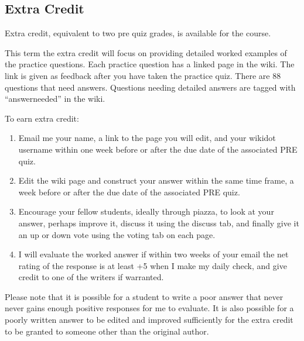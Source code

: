 \documentclass[letterpaper,10pt]{article}
\newif\ifonline
\begin{document}
\fi

\ifonline

\else
\subsection{Extra Credit}\label{sec:ExtraCredit}
Extra credit, equivalent to two pre quiz grades, is available for the
course.  

This term the extra credit will focus on providing detailed worked examples of the practice questions.  Each practice question has a linked page in the wiki.  The link is given as feedback after you have taken the practice quiz.  There are 88 questions that need answers.  Questions needing detailed answers are tagged with ``answerneeded'' in the wiki.

To earn extra credit:
\begin{enumerate}
    
    \item Email me your name, a link to the page you will edit, and your wikidot username within one week before or after the due date of the associated PRE quiz. 
    
    \item Edit the wiki page and construct your answer within the same time frame, a week before or after the due date of the associated PRE quiz.
    
    \item Encourage your fellow students, ideally through piazza, to look at your answer, perhaps improve it, discuss it using the discuss tab, and finally give it an up or down vote using the voting tab on each page.  
    
    \item I will evaluate the worked answer if within two weeks of your email the net rating of the response is at least +5 when I make my daily check, and give credit to one of the writers if warranted.

\end{enumerate}

Please note that it is possible for a student to write a poor answer that never never gains enough positive responses for me to evaluate.  It is also possible for a poorly written answer to be edited and improved sufficiently for the extra credit to be granted to someone other than the original author.
\fi
\end{document}
